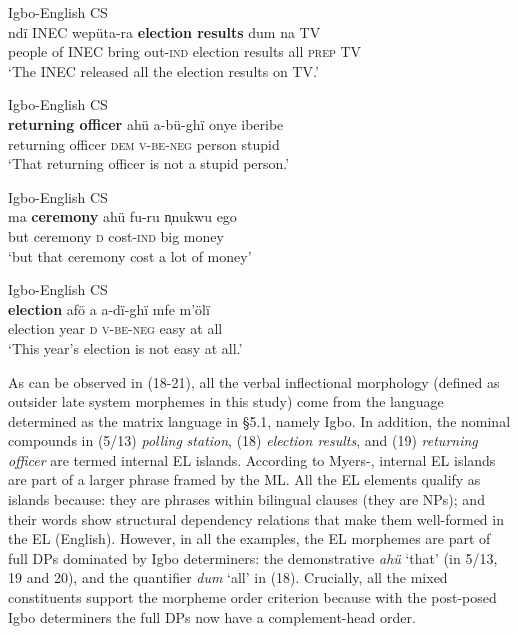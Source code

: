 \documentclass[output=paper]{langsci/langscibook}
\begin{document}
\ea
{Igbo-English CS}\\
\gll ndï    INEC  wepüta-ra  \textbf{election results}   dum  na  TV\\
     people of  INEC  bring out-\textsc{ind}   election results  all  \textsc{prep}  TV\\
\glt ‘The INEC released all the election results on TV.’    
\z

\ea
{Igbo-English CS}\\
\gll \textbf{returning officer  }ahü       a-bü-ghï        onye    iberibe\\
     returning officer     \textsc{dem}  \textsc{v-be-neg}  person  stupid\\
\glt ‘That returning officer is not a stupid person.’
\z

\ea
{Igbo-English CS}\\
\gll ma  \textbf{ceremony   }ahü  fu-ru      n̩nukwu   ego\\
     but ceremony  \textsc{d}  cost-\textsc{ind}  big    money\\
\glt ‘but that ceremony cost a lot of money’
\z

\ea
{Igbo-English CS}\\
\gll \textbf{election  }afö  a  a-dï-ghï  mfe  m’ölï\\
     election    year  \textsc{d}  \textsc{v-be-neg}  easy  at all\\
\glt ‘This year’s election is not easy at all.’
\z

As can be observed in (18-21), all the verbal inflectional morphology (defined as outsider late system morphemes in this study) come from the language determined as the matrix language in §5.1, namely Igbo. In addition, the nominal compounds in (5/13) \textit{polling}\textbf{\textit{ }}\textit{station}, (18) \textit{election results}, and (19) \textit{returning officer }are termed internal EL islands. According to Myers-\citet[265]{Scotton2006}, internal EL islands are part of a larger phrase framed by the ML. All the EL elements qualify as islands because: they are phrases within bilingual clauses (they are NPs); and their words show structural dependency relations that make them well-formed in the EL (English). However, in all the examples, the EL morphemes are part of full DPs dominated by Igbo determiners: the demonstrative \textit{ahü} ‘that’ (in 5/13, 19 and 20), and the quantifier \textit{dum }‘all’ in (18). Crucially, all the mixed constituents support the morpheme order criterion because with the post-posed Igbo determiners the full DPs now have a complement-head order. 
\end{document}
